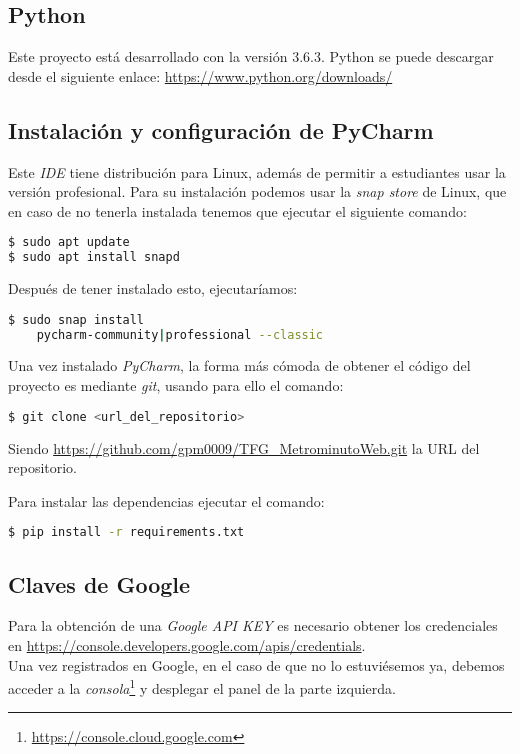 \subsection{Python}

Este proyecto está desarrollado con la versión 3.6.3. Python se puede descargar desde el siguiente enlace: 
\url{https://www.python.org/downloads/}

\subsection{Instalación y configuración de PyCharm}
Este \textit{IDE} tiene distribución para Linux, además de permitir a estudiantes usar la versión profesional. Para su instalación podemos usar la \textit{snap store} de Linux, que en caso de no tenerla instalada tenemos que ejecutar el siguiente comando:

\renewcommand{\lstlistingname}{Instalar PyCharm}%
\renewcommand{\lstlistlistingname}{List of \lstlistingname s}
\begin{lstlisting}[language=bash,caption={Instalar snapd}]
$ sudo apt update
$ sudo apt install snapd
\end{lstlisting}

Después de tener instalado esto, ejecutaríamos:
\begin{lstlisting}[language=bash,caption={Instalar PyCharm}]
$ sudo snap install 
	pycharm-community|professional --classic
\end{lstlisting}

Una vez instalado \textit{PyCharm}, la forma más cómoda de obtener el código del proyecto es mediante \textit{git}, usando para ello el comando:

\renewcommand{\lstlistingname}{Configurar PyCharm}%
\renewcommand{\lstlistlistingname}{List of \lstlistingname s}
\begin{lstlisting}[language=bash,caption={Descargar el repositorio}]
$ git clone <url_del_repositorio>
\end{lstlisting}
Siendo \url{https://github.com/gpm0009/TFG_MetrominutoWeb.git} la URL del repositorio.

Para instalar las dependencias ejecutar el comando:
\begin{lstlisting}[language=bash,caption={Instalar requirements.txt}]
$ pip install -r requirements.txt
\end{lstlisting}

\subsection{Claves de Google}\label{cap:google}
Para la obtención de una \textit{Google API KEY} es necesario obtener los credenciales en  \url{https://console.developers.google.com/apis/credentials}.\\
Una vez registrados en Google, en el caso de que no lo estuviésemos ya, debemos acceder a la \textit{consola}\footnote{\url{https://console.cloud.google.com}} y desplegar el panel de la parte izquierda.

